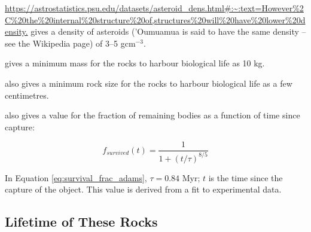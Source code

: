 \documentclass{article}
\begin{document}
\url{https://astrostatistics.psu.edu/datasets/asteroid_dens.html#:~:text=However%2C%20the%20internal%20structure%20of,structures%20will%20have%20lower%20density.} gives a density of asteroids ('Oumuamua is said to have the same density -- see the Wikipedia page) of 3--5 gcm$^{-3}$.

\citet{adams2022transfer} gives a minimum mass for the rocks to harbour biological life as 10 kg. 

\citet{adams2022transfer} also gives a minimum rock size for the rocks to harbour biological life as a few centimetres. 

\citet{adams2022transfer} also gives a value for the fraction of remaining bodies as a function of time since capture:

\begin{equation}
    f_{survived}(t) = \frac{1}{1 + (t/\tau)^{8/5}}
    \label{eq:survival_frac_adams}
\end{equation}

In Equation \ref{eq:survival_frac_adams}, $\tau = 0.84$ Myr; $t$ is the time since the capture of the object. This value is derived from a fit to experimental data. 

\subsection{Lifetime of These Rocks}





\end{document}
